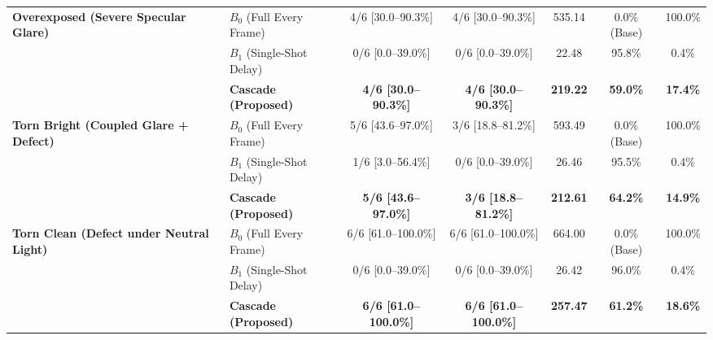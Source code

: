 \documentclass[final,5p,times,twocolumn,authoryear]{elsarticle}
\begin{document}
\begin{table}[t]
{\begin{tabular}{llccccc}
\midrule
\multirow{3}{*}{\textbf{Overexposed (Severe Specular Glare)}} 
 & $B_0$ (Full Every Frame) & 4/6 \scriptsize{[30.0--90.3\%]} & 4/6 \scriptsize{[30.0--90.3\%]} & 535.14 & 0.0\% (Base) & 100.0\% \\
 & $B_1$ (Single-Shot Delay) & 0/6 \scriptsize{[0.0--39.0\%]} & 0/6 \scriptsize{[0.0--39.0\%]} & 22.48 & 95.8\% & 0.4\% \\
 & \textbf{Cascade (Proposed)} & \textbf{4/6 \scriptsize{[30.0--90.3\%]}} & \textbf{4/6 \scriptsize{[30.0--90.3\%]}} & \textbf{219.22} & \textbf{59.0\%} & \textbf{17.4\%} \\
\midrule
\multirow{3}{*}{\textbf{Torn Bright (Coupled Glare + Defect)}} 
 & $B_0$ (Full Every Frame) & 5/6 \scriptsize{[43.6--97.0\%]} & 3/6 \scriptsize{[18.8--81.2\%]} & 593.49 & 0.0\% (Base) & 100.0\% \\
 & $B_1$ (Single-Shot Delay) & 1/6 \scriptsize{[3.0--56.4\%]} & 0/6 \scriptsize{[0.0--39.0\%]} & 26.46 & 95.5\% & 0.4\% \\
 & \textbf{Cascade (Proposed)} & \textbf{5/6 \scriptsize{[43.6--97.0\%]}} & \textbf{3/6 \scriptsize{[18.8--81.2\%]}} & \textbf{212.61} & \textbf{64.2\%} & \textbf{14.9\%} \\
\midrule
\multirow{3}{*}{\textbf{Torn Clean (Defect under Neutral Light)}} 
 & $B_0$ (Full Every Frame) & 6/6 \scriptsize{[61.0--100.0\%]} & 6/6 \scriptsize{[61.0--100.0\%]} & 664.00 & 0.0\% (Base) & 100.0\% \\
 & $B_1$ (Single-Shot Delay) & 0/6 \scriptsize{[0.0--39.0\%]} & 0/6 \scriptsize{[0.0--39.0\%]} & 26.42 & 96.0\% & 0.4\% \\
 & \textbf{Cascade (Proposed)} & \textbf{6/6 \scriptsize{[61.0--100.0\%]}} & \textbf{6/6 \scriptsize{[61.0--100.0\%]}} & \textbf{257.47} & \textbf{61.2\%} & \textbf{18.6\%} \\
\bottomrule
\end{tabular}%
}
\par\smallskip{}
\end{table}
\end{document}
